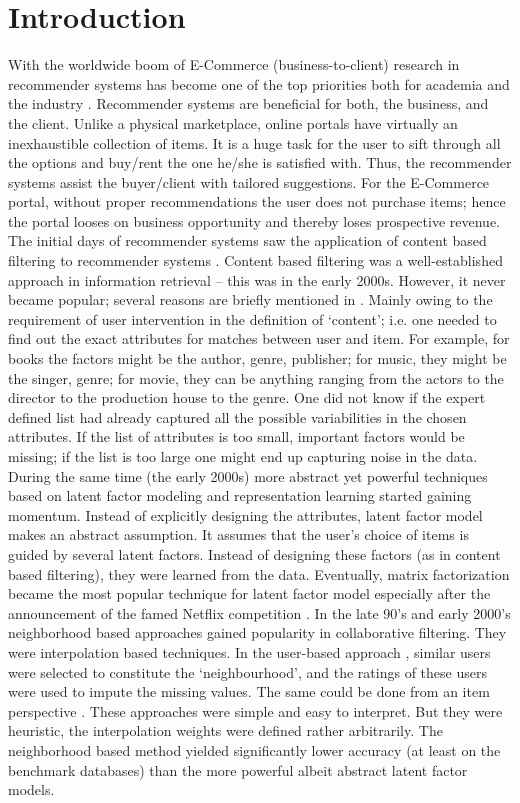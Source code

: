 \documentclass[conference]{IEEEtran}
\begin{document}
\section{Introduction}
With the worldwide boom of E-Commerce (business-to-client) research in recommender systems has become one of the top priorities both for academia and the industry \cite{Schafer1, Schafer2}. Recommender systems are beneficial for both, the business, and the client. Unlike a physical marketplace, online portals have virtually an inexhaustible collection of items. It is a huge task for the user to sift through all the options and buy/rent the one he/she is satisfied with. Thus, the recommender systems assist the buyer/client with tailored suggestions. For the E-Commerce portal, without proper recommendations the user does not purchase items; hence the portal looses on business opportunity and thereby loses prospective revenue.
The initial days of recommender systems saw the application of content based filtering to recommender systems \cite{Meteren1}. Content based filtering was a well-established approach in information retrieval – this was in the early 2000s. However, it never became popular; several reasons are briefly mentioned in \cite{Hofmann1}. Mainly owing to the requirement of user intervention in the definition of ‘content’; i.e. one needed to find out the exact attributes for matches between user and item. For example, for books the factors might be the author, genre, publisher; for music, they might be the singer, genre; for movie, they can be anything ranging from the actors to the director to the production house to the genre.
One did not know if the expert defined list had already captured all the possible variabilities in the chosen attributes. If the list of attributes is too small, important factors would be missing; if the list is too large one might end up capturing noise in the data.
During the same time (the early 2000s) more abstract yet powerful techniques based on latent factor modeling and representation learning started gaining momentum. Instead of explicitly designing the attributes, latent factor model makes an abstract assumption. It assumes that the user’s choice of items is guided by several latent factors. Instead of designing these factors (as in content based filtering), they were learned from the data. Eventually, matrix factorization \cite{Koren, Rennie} became the most popular technique for latent factor model especially after the announcement of the famed Netflix competition \cite{Bennett}.
In the late 90’s and early 2000’s neighborhood based approaches gained popularity in collaborative filtering. They were interpolation based techniques. In the user-based approach \cite{Herlocker}, similar users were selected to constitute the ‘neighbourhood’, and the ratings of these users were used to impute the missing values. The same could be done from an item perspective \cite{Sarwar}. These approaches were simple and easy to interpret. But they were heuristic, the interpolation weights were defined rather arbitrarily. The neighborhood based method yielded significantly lower accuracy (at least on the benchmark databases) than the more powerful albeit abstract latent factor models.
\end{document}
